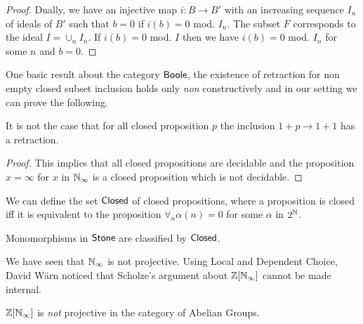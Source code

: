 \begin{proof}
  Dually, we have an injective map $i:B\rightarrow B'$ with an increasing sequence $I_n$ of ideals of $B'$ such that
  $b = 0$ if $i(b) = 0$ mod. $I_n$. The subset $F$ corresponds to the ideal $I = \cup_n I_n$. If $i(b) = 0$ mod. $I$
  then we have $i(b) = 0$ mod. $I_n$ for some $n$ and $b = 0$. 
\end{proof}



One basic result about the category $\mathsf{Boole}$, the existence of retraction for non empty closed subset inclusion
holds only {\em non} constructively and in our setting we can prove the following.


\begin{proposition}
 It is not the case that for all closed proposition $p$ the inclusion $1+p\rightarrow 1+1$ has a retraction.
\end{proposition}

\begin{proof}
  This implies that all closed propositions are decidable and the proposition $x=\infty$ for $x$ in $\mathbb{N}_{\infty}$ is a
  closed proposition which is not decidable.
\end{proof}

\medskip

We can define the set $\mathsf{Closed}$ of closed propositions, where a proposition is closed iff it is equivalent to
the proposition $\forall_n \alpha(n) = 0$ for some $\alpha$ in $2^{\mathbb{N}}$.

\begin{theorem}
  Monomorphisms in $\mathsf{Stone}$ are classified by $\mathsf{Closed}$.
\end{theorem}

\medskip

We have seen that $\mathbb{N}_{\infty}$ is not projective. Using Local and Dependent Choice, David Wärn noticed that Scholze's argument
about $\mathbb{Z}[\mathbb{N}_{\infty}]$ cannot be made internal.

\begin{theorem}
   $\mathbb{Z}[\mathbb{N}_{\infty}]$ is {\em not} projective in the category of Abelian Groups.
\end{theorem}
